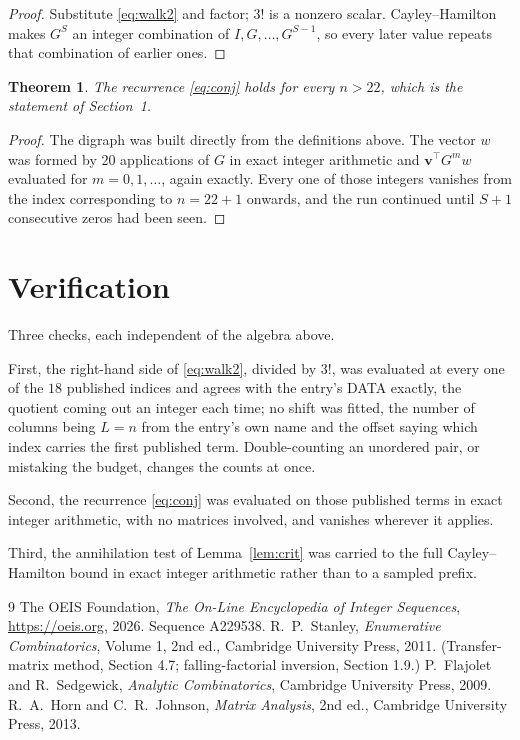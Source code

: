 \documentclass[11pt,a4paper]{article}
\theoremstyle{plain}
\newtheorem{theorem}{Theorem}
\theoremstyle{definition}
\begin{document}
\begin{proof}
Substitute \eqref{eq:walk2} and factor; $3!$ is a nonzero scalar. Cayley--Hamilton
makes $G^{S}$ an integer combination of $I,G,\dots,G^{S-1}$, so every later value repeats
that combination of earlier ones.
\end{proof}

\begin{theorem}
The recurrence \eqref{eq:conj} holds for every $n>22$, which is the statement of
Section~1.
\end{theorem}

\begin{proof}
The digraph was built directly from the definitions above. The vector $w$ was formed by
$20$ applications of $G$ in exact integer arithmetic and $\mathbf{v}^{\!\top}G^{m}w$
evaluated for $m=0,1,\dots$, again exactly. Every one of those integers vanishes from the
index corresponding to $n=22+1$ onwards, and the run continued until $S+1$ consecutive
zeros had been seen.
\end{proof}

\section{Verification}

Three checks, each independent of the algebra above.

First, the right-hand side of \eqref{eq:walk2}, divided by $3!$, was evaluated at every
one of the $18$ published indices and agrees with the entry's DATA exactly, the quotient
coming out an integer each time; no shift was fitted, the number of columns being $L=n$
from the entry's own name and the offset saying which index carries the first published term.
Double-counting an unordered pair, or mistaking the budget, changes the counts at once.

Second, the recurrence \eqref{eq:conj} was evaluated on those published terms in exact
integer arithmetic, with no matrices involved, and vanishes wherever it applies.

Third, the annihilation test of Lemma~\ref{lem:crit} was carried to the full
Cayley--Hamilton bound in exact integer arithmetic rather than to a sampled prefix.

\begin{thebibliography}{9}
 The OEIS Foundation, \emph{The On-Line Encyclopedia of Integer
Sequences}, \url{https://oeis.org}, 2026. Sequence A229538.
 R.~P.~Stanley, \emph{Enumerative Combinatorics}, Volume 1, 2nd ed.,
Cambridge University Press, 2011. (Transfer-matrix method, Section 4.7; falling-factorial
inversion, Section 1.9.)
 P.~Flajolet and R.~Sedgewick, \emph{Analytic Combinatorics}, Cambridge
University Press, 2009.
 R.~A.~Horn and C.~R.~Johnson, \emph{Matrix Analysis}, 2nd ed., Cambridge
University Press, 2013.
\end{thebibliography}
\end{document}
